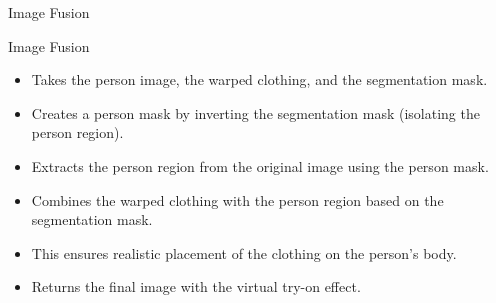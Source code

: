 \begin{algorithm}[H]
  \SetAlgoLined


  \caption{Image Fusion}
  \label{alg:image_fusion}
  \BlankLine

\end{algorithm}
\BlankLine
Image Fusion
\BlankLine
\begin{itemize}
    \item Takes the person image, the warped clothing, and the segmentation mask.
    \item Creates a person mask by inverting the segmentation mask (isolating the person region).
    \item Extracts the person region from the original image using the person mask.
    \item Combines the warped clothing with the person region based on the segmentation mask.
    \item This ensures realistic placement of the clothing on the person's body.
    \item Returns the final image with the virtual try-on effect.
\end{itemize}